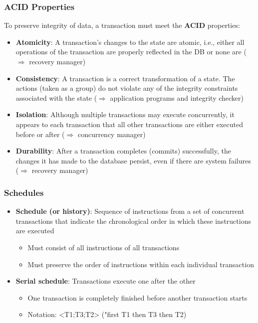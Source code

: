 \subsubsection{ACID Properties}
To preserve integrity of data, a transaction must meet the \textbf{ACID} properties:
\begin{itemize}[label=\(\rhd\)]
    \item \textbf{Atomicity}: A transaction's changes to the state are atomic, i.e., either all operations of the transaction are properly reflected in the DB or none are ($\Rightarrow$ recovery manager)
    \item \textbf{Consistency}: A transaction is a correct transformation of a state. The actions (taken as a group) do not violate any of the integrity constraints associated with the state ($\Rightarrow$ application programs and integrity checker)
    \item \textbf{Isolation}: Although multiple transactions may execute concurrently, it appears to each transaction that all other transactions are either executed before or after ($\Rightarrow$ concurrency manager)
    \item \textbf{Durability}: After a transaction completes (commits) successfully, the changes it has made to the database persist, even if there are system failures ($\Rightarrow$ recovery manager)
\end{itemize}

\subsubsection{Schedules}
\begin{itemize}[label=\(\rhd\)]
    \item \textbf{Schedule (or history)}: Sequence of instructions from a set of concurrent transactions that indicate the chronological order in which these instructions are executed
    \begin{itemize}[label=\(\rhd\)]
        \item Must consist of all instructions of all transactions
        \item Must preserve the order of instructions within each individual transaction
    \end{itemize}
    \item \textbf{Serial schedule}: Transactions execute one after the other
    \begin{itemize}[label=\(\rhd\)]
        \item One transaction is completely finished before another transaction starts
        \item Notation: <T1;T3;T2> ("first T1 then T3 then T2)
    \end{itemize}
\end{itemize}

